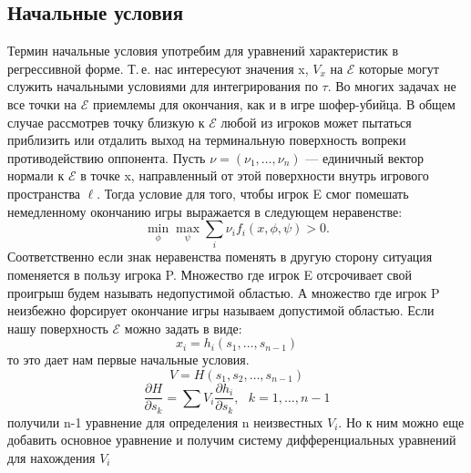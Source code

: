 \documentclass[14pt,a4paper]{extarticle}
\begin{document}
	\subsection{Начальные условия}
	Термин начальные условия употребим для уравнений характеристик в регрессивной форме. Т.\,е. нас интересуют значения x, $V_x$ на $ \mathcal{E}$ которые могут служить начальными условиями для интегрирования по $\tau$. Во многих задачах не все точки на $ \mathcal{E}$  приемлемы для окончания, как и в игре шофер-убийца. В общем случае рассмотрев точку близкую к $ \mathcal{E}$ любой из игроков может пытаться приблизить или отдалить выход на терминальную поверхность вопреки противодействию оппонента. Пусть $\nu = (\nu_1, \dots, \nu_n)$ --- единичный вектор нормали к $ \mathcal{E}$ в точке x, направленный от этой поверхности внутрь игрового пространства $\ell$. Тогда условие для того, чтобы игрок E смог помешать немедленному окончанию игры выражается в следующем неравенстве:
	\[\min_\phi \max_\psi \sum_i \nu_i f_i(x, \phi, \psi) > 0.\] Соответственно если знак неравенства поменять в другую сторону ситуация поменяется в пользу игрока P. Множество где игрок E отсрочивает свой проигрыш будем называть недопустимой областью. А множество где игрок P неизбежно форсирует окончание игры называем допустимой областью.
	Если нашу поверхность $ \mathcal{E}$ можно задать в виде: 
	\[x_i = h_i(s_1, \dots, s_{n-1})\]
	то это дает нам первые начальные условия. 
	\[V = H(s_1, s_2, \dots, s_{n-1})\]
	\[\frac{\partial H}{\partial s_k} = \sum{V_i \frac{\partial h_i}{\partial s_k}}, \ \ \ k = 1, \dots, n-1\]
	получили n-1 уравнение для определения n неизвестных $V_i$. Но к ним можно еще добавить основное уравнение и получим систему дифференциальных уравнений для нахождения $V_i$
	
\end{document}
